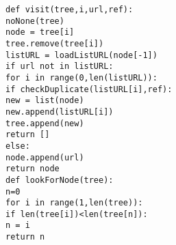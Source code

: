 \documentclass[a4paper]{report}
\begin{document}
\noindent \texttt{def visit(tree,i,url,ref):}\\
\hspace*{1cm}	\texttt{noNone(tree)}\\
\hspace*{1cm}	\texttt{node = tree[i]}\\
\hspace*{1cm}	\texttt{tree.remove(tree[i])}\\
\hspace*{1cm}	\texttt{listURL = loadListURL(node[-1])}\\
\hspace*{1cm}	\texttt{if url not in listURL:}\\
\hspace*{2cm}		\texttt{for i in range(0,len(listURL)):}\\
\hspace*{3cm}			\texttt{if checkDuplicate(listURL[i],ref):}\\
\hspace*{4cm}				\texttt{new = list(node)}\\
\hspace*{4cm}				\texttt{new.append(listURL[i])}\\
\hspace*{4cm}				\texttt{tree.append(new)}\\
\hspace*{2cm}		\texttt{return []}\\
\hspace*{1cm}	\texttt{else:}\\
\hspace*{2cm}		\texttt{node.append(url)}\\
\hspace*{2cm}		\texttt{return node}\\

\noindent \texttt{def lookForNode(tree):}\\
\hspace*{1cm}	\texttt{n=0}\\
\hspace*{1cm}	\texttt{for i in range(1,len(tree)):}\\
\hspace*{2cm}		\texttt{if len(tree[i])<len(tree[n]):}\\
\hspace*{3cm}			\texttt{n = i}\\
\hspace*{1cm}	\texttt{return n}\\
\end{document}
